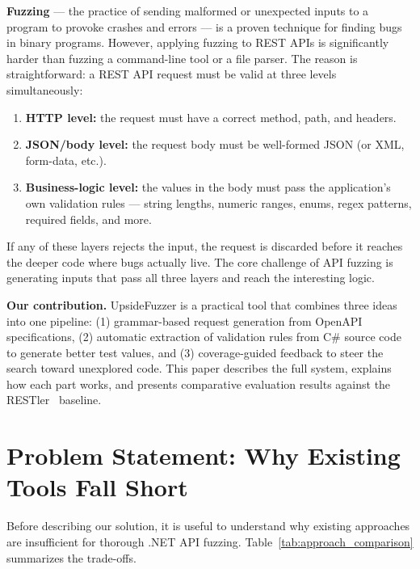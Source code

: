 \documentclass[conference]{IEEEtran}
\begin{document}
\textbf{Fuzzing} --- the practice of sending malformed or unexpected inputs to a program to provoke crashes and errors --- is a proven technique for finding bugs in binary programs. However, applying fuzzing to REST APIs is significantly harder than fuzzing a command-line tool or a file parser. The reason is straightforward: a REST API request must be valid at three levels simultaneously:

\begin{enumerate}
    \item \textbf{HTTP level:} the request must have a correct method, path, and headers.
    \item \textbf{JSON/body level:} the request body must be well-formed JSON (or XML, form-data, etc.).
    \item \textbf{Business-logic level:} the values in the body must pass the application's own validation rules --- string lengths, numeric ranges, enums, regex patterns, required fields, and more.
\end{enumerate}

If any of these layers rejects the input, the request is discarded before it reaches the deeper code where bugs actually live. The core challenge of API fuzzing is generating inputs that pass all three layers and reach the interesting logic.

\textbf{Our contribution.} UpsideFuzzer is a practical tool that combines three ideas into one pipeline: (1) grammar-based request generation from OpenAPI specifications, (2) automatic extraction of validation rules from C\# source code to generate better test values, and (3) coverage-guided feedback to steer the search toward unexplored code. This paper describes the full system, explains how each part works, and presents comparative evaluation results against the RESTler~\cite{restler_icse19} baseline.

\section{Problem Statement: Why Existing Tools Fall Short}
\label{sec:problem}

Before describing our solution, it is useful to understand why existing approaches are insufficient for thorough .NET API fuzzing. Table~\ref{tab:approach_comparison} summarizes the trade-offs.
\end{document}
